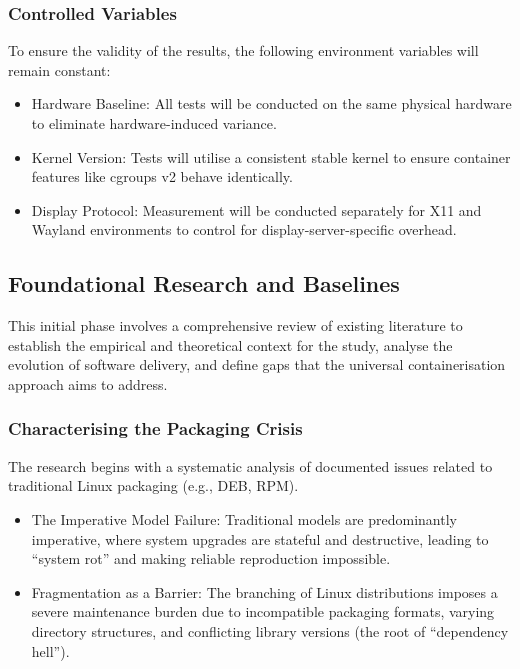 \documentclass[journal,onecolumn]{IEEEtran}
\begin{document}
\subsubsection{Controlled Variables}
To ensure the validity of the results, the following environment variables will remain constant:
\begin{itemize}
    \item Hardware Baseline: All tests will be conducted on the same physical hardware to eliminate hardware-induced variance.
    \item Kernel Version: Tests will utilise a consistent stable kernel to ensure container features like cgroups v2 behave identically.
    \item Display Protocol: Measurement will be conducted separately for X11 and Wayland environments to control for display-server-specific overhead.
\end{itemize}

\subsection{Foundational Research and Baselines}
This initial phase involves a comprehensive review of existing literature to establish the empirical and theoretical context for the study, analyse the evolution of software delivery, and define gaps that the universal containerisation approach aims to address.

\subsubsection{Characterising the Packaging Crisis}
The research begins with a systematic analysis of documented issues related to traditional Linux packaging (e.g., DEB, RPM). 
\begin{itemize}
    \item The Imperative Model Failure: Traditional models are predominantly imperative, where system upgrades are stateful and destructive, leading to ``system rot'' and making reliable reproduction impossible. 
    \item Fragmentation as a Barrier: The branching of Linux distributions imposes a severe maintenance burden due to incompatible packaging formats, varying directory structures, and conflicting library versions (the root of ``dependency hell'').
\end{itemize}
\end{document}
